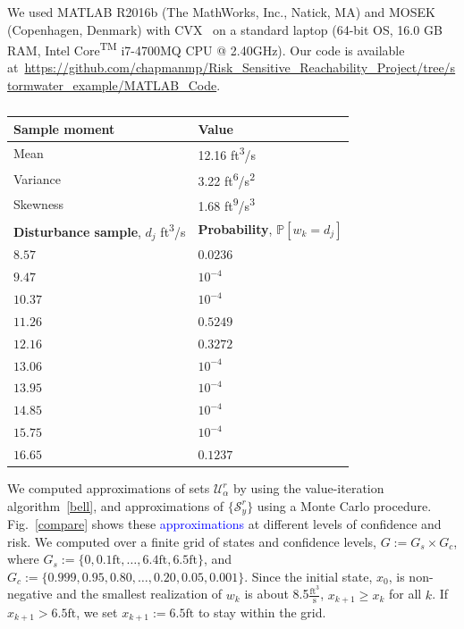 \documentclass[letterpaper, 10 pt, conference]{ieeeconf}  %
\newcommand{\mpc}[1]{{\color{cyan} #1}}
\newcommand{\mpc}[1]{#1}
\begin{document}
We used MATLAB R2016b (The MathWorks, Inc., Natick, MA) and MOSEK (Copenhagen, Denmark) with CVX~\cite{grant2008cvx} on a
standard laptop (64-bit OS, 16.0 GB RAM, Intel\textsuperscript{\textregistered} Core\textsuperscript{TM} i7-4700MQ CPU @ 2.40GHz).
Our code is available at~\url{https://github.com/chapmanmp/Risk_Sensitive_Reachability_Project/tree/stormwater_example/MATLAB_Code}.
%
\begin{table}
\begin{center}
\caption{}
\begin{tabular}{| p{3.5cm} | p{3.5cm} |}
\hline
\bf{Sample moment} & \bf{Value}  \\ \hline
Mean & 12.16 ft\textsuperscript{3}/s \\ 
Variance & 3.22 ft\textsuperscript{6}/s\textsuperscript{2} \\ 
Skewness & 1.68 ft\textsuperscript{9}/s\textsuperscript{3} \\ 
\hline 
\textbf{Disturbance sample}, $d_j$ ft\textsuperscript{3}/s & \textbf{Probability}, $\mathbb{P}[w_k = d_j]$ \\ \hline
$8.57$ 		& $0.0236$ \\
$9.47$ 		& $10^{-4}$ \\
$10.37$ 		& $10^{-4}$ \\
$11.26$  & $0.5249$ \\ 
$12.16$ & $0.3272$ \\ 
$13.06$  & $10^{-4}$ \\ 
$13.95$  & $10^{-4}$ \\ 
$14.85$  & $10^{-4}$ \\ 
$15.75$  & $10^{-4}$ \\ 
$16.65$  & $0.1237$ \\ \hline
\end{tabular}
\begin{flushleft} \end{flushleft}
\label{dist}
\end{center}
\end{table}
%

We \mpc{computed approximations of sets  $\mathcal{U}_{\alpha}^r$ by using the value-iteration algorithm~\eqref{bell},
and approximations of $\{\mathcal{S}_y^r\}$ using a Monte Carlo procedure}.
Fig.~\ref{compare} shows these \textcolor{blue}{approximations} at different levels of confidence and risk.
We computed over a finite grid of states and confidence levels, $G := G_s \times G_c$, where  
$G_s := \{0, 0.1\text{ft}, \dots, 6.4\text{ft}, 6.5\text{ft}\}$,
and $G_c := \{0.999, 0.95, 0.80, \dots, 0.20, 0.05, 0.001\}$.
Since the initial state, $x_0$, is non-negative and the smallest realization of $w_k$ is about 8.5$\frac{\text{ft}^3}{\text{s}}$, 
$x_{k+1}\geq x_k$ for all $k$. 
If $x_{k+1} > 6.5\text{ft}$, we set $x_{k+1} := 6.5\text{ft}$ to stay within the grid.
\end{document}
